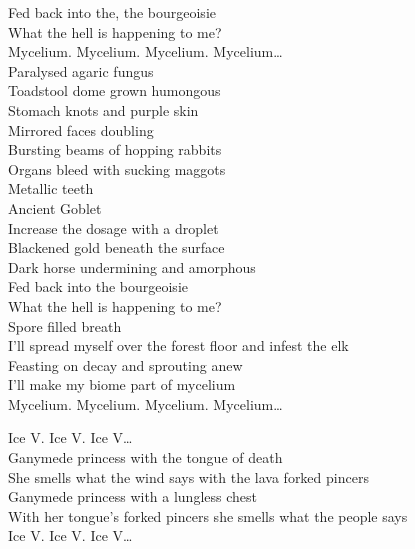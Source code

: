 Fed back into the, the bourgeoisie \\
What the hell is happening to me? \\

Mycelium. Mycelium. Mycelium. Mycelium… \\

Paralysed agaric fungus \\
Toadstool dome grown humongous \\
Stomach knots and purple skin \\
Mirrored faces doubling \\
Bursting beams of hopping rabbits \\
Organs bleed with sucking maggots \\
Metallic teeth \\
Ancient Goblet \\
Increase the dosage with a droplet \\
Blackened gold beneath the surface \\
Dark horse undermining and amorphous \\
Fed back into the bourgeoisie \\
What the hell is happening to me? \\
Spore filled breath \\
I'll spread myself over the forest floor and infest the elk \\
Feasting on decay and sprouting anew \\
I'll make my biome part of mycelium \\

Mycelium. Mycelium. Mycelium. Mycelium… \\




Ice V. Ice V. Ice V… \\

Ganymede princess with the tongue of death \\
She smells what the wind says with the lava forked pincers \\
Ganymede princess with a lungless chest \\
With her tongue's forked pincers she smells what the people says \\

Ice V. Ice V. Ice V… \\

